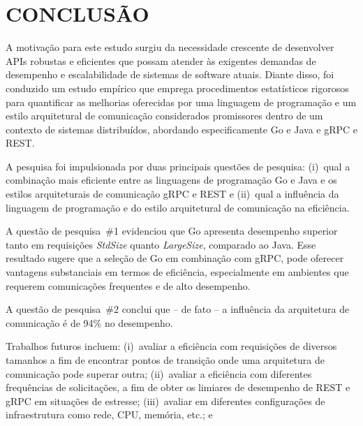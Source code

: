 \chapter{CONCLUSÃO}
\label{cap:conclusao}

A motivação para este estudo surgiu da necessidade crescente de desenvolver APIs robustas e eficientes que possam atender às exigentes demandas de desempenho e escalabilidade de sistemas de software atuais. Diante disso, 
foi conduzido um estudo empírico que emprega procedimentos estatísticos rigorosos para quantificar as melhorias oferecidas por uma linguagem de programação e um estilo arquitetural de comunicação considerados promissores dentro de um contexto de sistemas distribuídos, abordando especificamente Go e Java e gRPC e REST. 

A pesquisa foi impulsionada por duas principais questões de pesquisa: (i)~qual a combinação mais eficiente entre as linguagens de programação Go e Java e os estilos arquiteturais de comunicação gRPC e REST e (ii)~qual a influência da linguagem de programação e do estilo arquitetural de comunicação na eficiência. 

A questão de pesquisa~\#1 evidenciou que Go apresenta desempenho superior tanto em requisições \textit{StdSize} quanto \textit{LargeSize}, 
comparado ao Java. Esse resultado sugere que a seleção de Go em combinação com gRPC, pode oferecer vantagens substanciais em termos de eficiência, especialmente em ambientes que requerem comunicações frequentes e de alto desempenho.

A questão de pesquisa~\#2 conclui que -- de fato -- a influência da arquitetura de comunicação é de 94\% no desempenho.


Trabalhos futuros incluem: 
(i)~avaliar a eficiência com requisições de diversos tamanhos a fim de encontrar pontos de transição onde uma arquitetura de comunicação pode superar outra; 
(ii)~avaliar a eficiência com diferentes frequências de solicitações, a fim de obter os limiares de desempenho de REST e gRPC em situações de estresse;
(iii)~avaliar em diferentes configurações de infraestrutura como rede, CPU, memória, etc.; e
